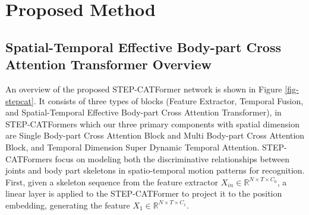 \documentclass{bmvc2k}
\begin{document}
\section{Proposed Method}















\subsection{Spatial-Temporal Effective Body-part Cross Attention Transformer Overview}
An overview of the proposed STEP-CATFormer network is shown in Figure \ref{fig-stepcat}. It consists of three types of blocks (Feature Extractor, Temporal Fusion, and Spatial-Temporal Effective Body-part Cross Attention Transformer), in STEP-CATFormers which our three primary components with spatial dimension are Single Body-part Cross Attention Block and Multi Body-part Cross Attention Block, and Temporal Dimension Super Dynamic Temporal Attention. STEP-CATFormers focus on modeling both the discriminative relationships between joints and body part skeletons in spatio-temporal motion patterns for recognition. First, given a skeleton sequence from the feature extractor $X_{in}\in\mathbb{R}^{N\times T\times C_{0}}$, a linear layer is applied to the STEP-CATFormer to project it to the position embedding, generating the feature $X_{1}\in\mathbb{R}^{N\times T\times C_{1}}$.
\end{document}
